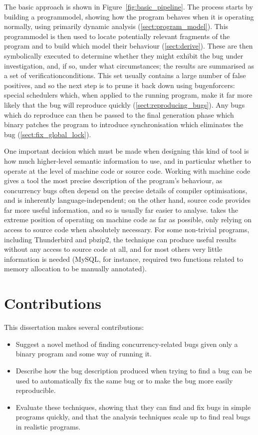 The basic approach is shown in Figure~\ref{fig:basic_pipeline}.  The
process starts by building a \gls{programmodel}, showing how the
program behaves when it is operating normally, using primarily dynamic
analysis (\autoref{sect:program_model}).  This \gls{programmodel} is
then used to locate potentially relevant fragments of the program and
to build {\StateMachines} which model their behaviour
(\autoref{sect:derive}).  These {\StateMachines} are then symbolically
executed to determine whether they might exhibit the bug under
investigation, and, if so, under what circumstances; the results are
summarised as a set of \glspl{verificationcondition}.  This set
usually contains a large number of false positives, and so the next
step is to prune it back down using \glspl{bugenforcer}: special
schedulers which, when applied to the running program, make it far
more likely that the bug will reproduce quickly
(\autoref{sect:reproducing_bugs}).  Any bugs which do reproduce can
then be passed to the final {\genfix} generation phase which binary
patches the program to introduce synchronisation which eliminates the
bug (\autoref{sect:fix_global_lock}).

One important decision which must be made when designing this kind of
tool is how much higher-level semantic information to use, and in
particular whether to operate at the level of machine code or source
code.  Working with machine code gives a tool the most precise
description of the program's behaviour, as concurrency bugs often
depend on the precise details of compiler optimisations, and is
inherently language-independent; on the other hand, source code
provides far more useful information, and so is usually far easier to
analyse.  {\Technique} takes the extreme position of operating on
machine code as far as possible, only relying on access to source code
when absolutely necessary.  For some non-trivial programs, including
Thunderbird and pbzip2, the technique can produce useful results
without any access to source code at all, and for most others very
little information is needed (MySQL, for instance, required two
functions related to memory allocation to be manually annotated).

\section{Contributions}

This dissertation makes several contributions:

\begin{itemize}
\item
  Suggest a novel method of finding concurrency-related bugs given
  only a binary program and some way of running it.
\item
  Describe how the bug description produced when trying to find a bug
  can be used to automatically fix the same bug or to make the bug
  more easily reproducible.
\item
  Evaluate these techniques, showing that they can find and fix bugs
  in simple programs quickly, and that the analysis techniques scale
  up to find real bugs in realistic programs.
\end{itemize}

